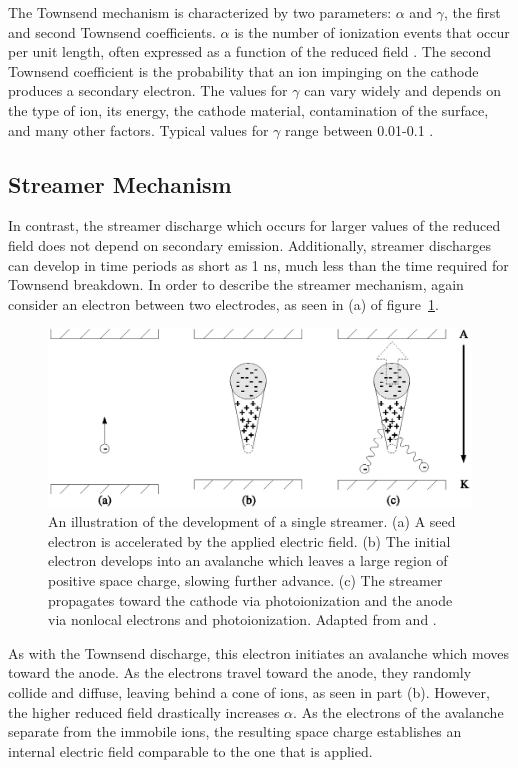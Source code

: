 The Townsend mechanism is characterized by two parameters: $\alpha$ and
$\gamma$, the first and second Townsend coefficients. $\alpha$ is the number of
ionization events that occur per unit length, often expressed as a function of
the reduced field \cite{Druyvesteyn1940}. The second Townsend coefficient is the
probability that an ion impinging on the cathode produces a secondary electron.
The values for $\gamma$ can vary widely and depends on the type of ion, its
energy, the cathode material, contamination of the surface, and many other
factors. Typical values for $\gamma$ range between 0.01-0.1 \cite{Lieberman2005}.

\subsection{Streamer Mechanism}

In contrast, the streamer discharge which occurs for larger values of the
reduced field does not depend on secondary emission. Additionally, streamer
discharges can develop in time periods as short as 1 ns, much less than the time
required for Townsend breakdown. In order to describe the streamer mechanism,
again consider an electron between two electrodes, as seen in (a) of
figure~\ref{fig:streamer}.
\begin{figure}
  \centering
  \includegraphics{./chapters/theory/figures/streamer.eps}
  \caption{An illustration of the development of a single streamer. (a)
    A seed electron is accelerated by the applied electric field. (b) The
    initial electron develops into an avalanche which leaves a large region
    of positive space charge, slowing further advance. (c) The streamer
    propagates toward the cathode via photoionization and the anode via
    nonlocal electrons and photoionization. Adapted from \cite{Levatter1980} and
    \cite{Kunhardt1980}.}
  \label{fig:streamer}
\end{figure}
As with the Townsend discharge, this electron initiates an avalanche which moves
toward the anode. As the electrons travel toward the anode, they randomly
collide and diffuse, leaving behind a cone of ions, as seen in part (b).
However, the higher reduced field drastically increases $\alpha$. As the
electrons of the avalanche separate from the immobile ions, the resulting space
charge establishes an internal electric field comparable to the one that is
applied.

